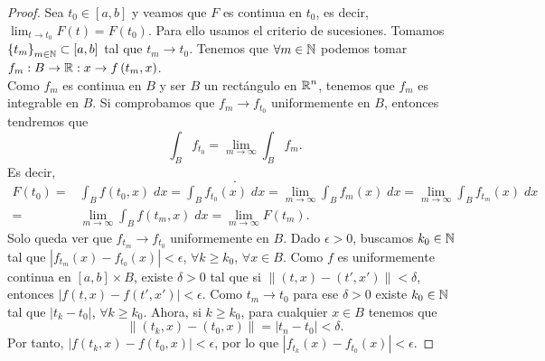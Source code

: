 \begin{proof}
	Sea $\displaystyle t_{0}\in \left[a,b\right]  $ y veamos que $\displaystyle F $ es continua en $\displaystyle t_{0} $, es decir, $\displaystyle \lim_{t \to t_{0}}F\left(t\right)=F\left(t_{0}\right) $. Para ello usamos el criterio de sucesiones. Tomamos $\displaystyle \left\{ t_{m}\right\} _{m\in\mathbb{N}}\subset \left[a,b\right]  $ tal que $\displaystyle t_{m}\to t_{0} $. Tenemos que $\displaystyle \forall m \in \mathbb{N} $ podemos tomar $\displaystyle f_{m} : B \to \mathbb{R} : x \to f\left(t_{m}, x\right) $. \\
	Como $\displaystyle f_{m} $ es continua en $\displaystyle B $ y ser $\displaystyle B $ un rectángulo en $\displaystyle \mathbb{R}^{n} $, tenemos que $\displaystyle f_{m} $ es integrable en $\displaystyle B $. Si comprobamos que $\displaystyle f_{m}\to f_{t_{0}} $ uniformemente en $\displaystyle B $, entonces tendremos que
\[\int _{B}f_{t_{0}} =\lim_{m \to \infty}\int _{B}f_{m}  .\]
Es decir,
\[ .\]
\[
\begin{split}
	F\left(t_{0}\right)= & \int _{B}f\left(t_{0}, x\right) \; dx = \int _{B}f_{t_{0}}\left(x\right) \; dx=\lim_{m \to \infty}\int _{B}f_{m}\left(x\right) \; dx=\lim_{m \to \infty}\int _{B}f_{t_{m}}\left(x\right) \; dx \\
	= &  \lim_{m \to \infty}\int _{B}f\left(t_{m}, x\right) \; dx = \lim_{m  \to \infty}F\left(t_{m}\right).
\end{split}
\]
Solo queda ver que $\displaystyle f_{t_{m}}\to f_{t_{0}} $ uniformemente en $\displaystyle B $. Dado $\displaystyle \epsilon > 0 $, buscamos $\displaystyle k_{0} \in \mathbb{N} $ tal que $\displaystyle \left|f_{t_{m}}\left(x\right)-f_{t_{0}}\left(x\right)\right|<\epsilon  $, $\displaystyle \forall k \geq k_{0} $, $\displaystyle \forall x \in B $. Como $\displaystyle f $ es uniformemente continua en $\displaystyle \left[a,b\right] \times B $, existe $\displaystyle \delta > 0 $ tal que si $\displaystyle \|\left(t,x\right)-\left(t',x'\right)\| < \delta  $, entonces $\displaystyle \left|f\left(t,x\right)-f\left(t',x'\right)\right|<\epsilon  $. 
Como $\displaystyle t_{m}\to t_{0} $ para ese $\displaystyle \delta > 0 $ existe $\displaystyle k_{0} \in \mathbb{N} $ tal que $\displaystyle \left|t_{k}-t_{0}\right| $, $\displaystyle \forall k \geq k_{0} $. Ahora, si $\displaystyle k \geq k_{0} $, para cualquier $\displaystyle x \in B $ tenemos que 
\[\|\left(t_{k}, x\right)-\left(t_{0}, x\right)\|= \left|t_{n}-t_{0}\right|<\delta  .\]
Por tanto, $\displaystyle \left|f\left(t_{k}, x\right)-f\left(t_{0},x\right)\right|<\epsilon  $, por lo que $\displaystyle \left|f_{t_{k}}\left(x\right)-f_{t_{0}}\left(x\right)\right|<\epsilon  $. 
\end{proof}
